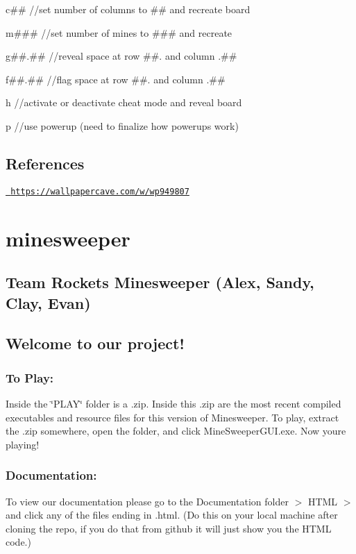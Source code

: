 c\#\# //set number of columns to \#\# and recreate board

m\#\#\# //set number of mines to \#\#\# and recreate

g\#\#.\#\# //reveal space at row \#\#. and column .\#\#

f\#\#.\#\# //flag space at row \#\#. and column .\#\#

h //activate or deactivate cheat mode and reveal board

p //use powerup (need to finalize how powerups work)

\subsection*{References}

\href{https://wallpapercave.com/w/wp949807}{\texttt{ https\+://wallpapercave.\+com/w/wp949807}}





\section*{minesweeper}

\subsection*{Team Rocket\textquotesingle{}s Minesweeper (Alex, Sandy, Clay, Evan)}

\subsection*{Welcome to our project!}

\subsubsection*{To Play\+:}

Inside the \char`\"{}\+P\+L\+A\+Y\char`\"{} folder is a .zip. Inside this .zip are the most recent compiled executables and resource files for this version of Minesweeper. To play, extract the .zip somewhere, open the folder, and click Mine\+Sweeper\+G\+U\+I.\+exe. Now you\textquotesingle{}re playing!

\subsubsection*{Documentation\+:}

To view our documentation please go to the Documentation folder $>$ H\+T\+ML $>$ and click any of the files ending in .html. (Do this on your local machine after cloning the repo, if you do that from github it will just show you the H\+T\+ML code.)

